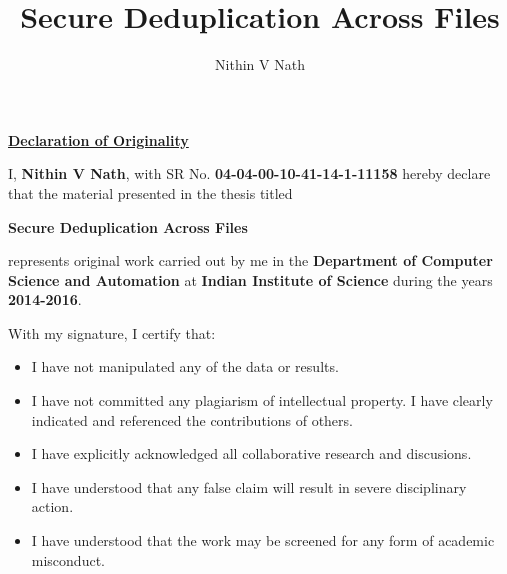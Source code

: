 \documentclass[oneside,12pt]{IIScthesisPSnPDF}
\begin{document}
\title{Secure Deduplication Across Files} 

\submitdate{\monthyeardate\today} 
\me
\author{Nithin V Nath}



\maketitle


\begin{center}
\LARGE{\underline{\textbf{Declaration of Originality}}}
\end{center}
\noindent I, \textbf{Nithin V Nath}, with SR No. \textbf{04-04-00-10-41-14-1-11158} hereby declare that
the material presented in the thesis titled

\begin{center}
\textbf{Secure Deduplication Across Files}
\end{center}

\noindent represents original work carried out by me in the \textbf{Department
of Computer Science and Automation} at \textbf{Indian Institute of
Science} during the years \textbf{2014-2016}.

\noindent With my signature, I certify that:
\begin{itemize}
	\item I have not manipulated any of the data or results.
	\item I have not committed any plagiarism of intellectual
	property.
	I have clearly indicated and referenced the contributions of
	others.
	\item I have explicitly acknowledged all collaborative research
	and discusions.
	\item I have understood that any false claim will result in severe
	disciplinary action.
	\item I have understood that the work may be screened for any form
	of academic misconduct.
\end{itemize}

\vspace{20mm}

 \qquad

\vspace{20mm}
\end{document}
